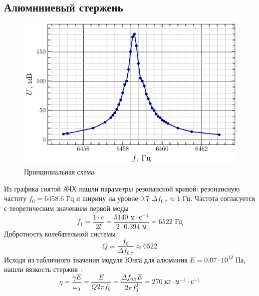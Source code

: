 \subsection{Алюминиевый стержень}
\begin{figure}[H]
	\centering
	\includegraphics[scale=1.5]{fig/al_afc}
	\caption{Принципиальная схема}
	\label{fig:chem1}
\end{figure}

Из графика снятой АЧХ нашли параметры резонансной кривой: резонансную частоту
$f_0=6458.6\text{ Гц}$ и ширину на уровне 0.7 $\Delta f_{0.7} \approx 1\text{ Гц}$. 
Частота согласуется с теоретическим значением первой моды
\begin{equation}
	f_1 = \frac{1\cdot c}{2l} = \frac{5140 \text{ м}\cdot\text{с}^{-1}}{2\cdot 0.394\text{ м}}=6522 \text{ Гц}
\end{equation}
Добротность колебательной системы
\begin{equation}
	Q = \frac{f_0}{\Delta f_{0.7}} \approx 6522
\end{equation}
Исходя из табличного значения модуля Юнга для алюминия $E=0.07\cdot10^{12}$ Па, нашли вязкость стержня  \cite[стр. 10]{met}:
\begin{equation}
	\eta = \frac{\gamma E}{\omega_0}= \frac{ E}{Q 2\pi f_0} = \frac{\Delta f_{0.7} E}{2\pi f_0^2}= 270 \text{ кг}\cdot\text{м}^{-1}\cdot\text{с}^{-1}
\end{equation}
